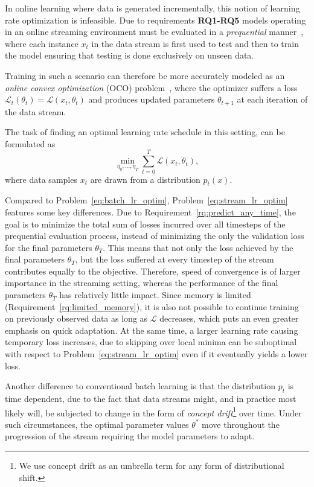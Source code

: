 \documentclass[letterpaper]{article} %
\begin{document}
In online learning where data is generated incrementally, this notion of learning rate optimization is infeasible.
Due to requirements \textbf{RQ1-RQ5} models operating in an online streaming environment must be evaluated in a \textit{prequential} manner~\cite{bifetMOAMassiveOnline2010}, where each instance $x_t$ in the data stream is first used to test and then to train the model ensuring that testing is done exclusively on unseen data.

Training in such a scenario can therefore be more accurately modeled as an \textit{online convex optimization} (OCO) problem~\cite{shalev-shwartzOnlineLearningOnline2011,hazanIntroductionOnlineConvex2016}, where the optimizer suffers a loss $\mathcal{L}_t(\theta_t) = \mathcal{L}(x_t, \theta_{t})$ and produces updated parameters $\theta_{t+1}$ at each iteration of the data stream.

The task of finding an optimal learning rate schedule in this setting, can be formulated as
\begin{equation}
	\label{eq:stream_lr_optim}
	\min_{\eta_0, \ldots, \eta_T} \sum_{t=0}^{T} \mathcal{L}(x_t, \theta_t),
\end{equation}
where data samples $x_t$ are drawn from a distribution $p_t(x)$.

Compared to Problem~\eqref{eq:batch_lr_optim}, Problem~\eqref{eq:stream_lr_optim} features some key differences.
Due to Requirement~\ref{rq:predict_any_time}, the goal is to minimize the total sum of losses incurred over all timesteps of the prequential evaluation process,  instead of minimizing the only the validation loss for the final parameters $\theta_T$.
This means that not only the loss achieved by the final parameters $\theta_T$, but the loss suffered at every timestep of the stream contributes equally to the objective.
Therefore, speed of convergence is of larger importance in the streaming setting, whereas the performance of the final parameters $\theta_T$ has relatively little impact.
Since memory is limited (Requirement~\ref{rq:limited_memory}), it is also not possible to continue training on previously observed data as long as $\mathcal{L}$ decreases, which puts an even greater emphasis on quick adaptation.
At the same time, a larger learning rate causing temporary loss increases, due to skipping over local minima can be suboptimal with respect to Problem~\ref{eq:stream_lr_optim} even if it eventually yields a lower loss.

Another difference to conventional batch learning is that the distribution $p_t$ is time dependent, due to the fact that data streams might, and in practice most likely will, be subjected to change in the form of \textit{concept drift}\footnote{We use concept drift as an umbrella term for any form of distributional shift.} over time.
Under such circumstances, the optimal parameter values $\theta^*$ move throughout the progression of the stream requiring the model parameters to adapt.
\end{document}

